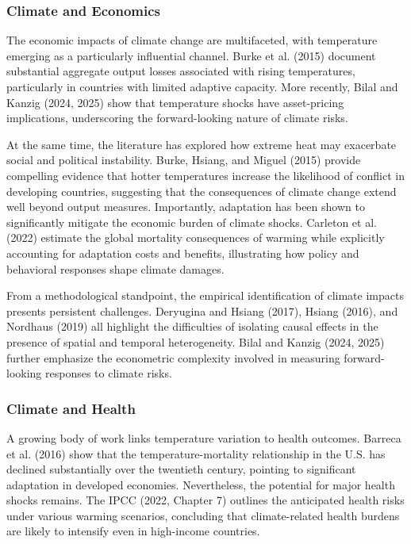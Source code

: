 \documentclass{article}
\begin{document}
\subsubsection{Climate and Economics}

The economic impacts of climate change are multifaceted, with temperature emerging as a particularly influential channel. Burke et al. (2015) document substantial aggregate output losses associated with rising temperatures, particularly in countries with limited adaptive capacity. More recently, Bilal and Kanzig (2024, 2025) show that temperature shocks have asset-pricing implications, underscoring the forward-looking nature of climate risks.

At the same time, the literature has explored how extreme heat may exacerbate social and political instability. Burke, Hsiang, and Miguel (2015) provide compelling evidence that hotter temperatures increase the likelihood of conflict in developing countries, suggesting that the consequences of climate change extend well beyond output measures. Importantly, adaptation has been shown to significantly mitigate the economic burden of climate shocks. Carleton et al. (2022) estimate the global mortality consequences of warming while explicitly accounting for adaptation costs and benefits, illustrating how policy and behavioral responses shape climate damages.

From a methodological standpoint, the empirical identification of climate impacts presents persistent challenges. Deryugina and Hsiang (2017), Hsiang (2016), and Nordhaus (2019) all highlight the difficulties of isolating causal effects in the presence of spatial and temporal heterogeneity. Bilal and Kanzig (2024, 2025) further emphasize the econometric complexity involved in measuring forward-looking responses to climate risks.

\subsubsection{Climate and Health}

A growing body of work links temperature variation to health outcomes. Barreca et al. (2016) show that the temperature-mortality relationship in the U.S. has declined substantially over the twentieth century, pointing to significant adaptation in developed economies. Nevertheless, the potential for major health shocks remains. The IPCC (2022, Chapter 7) outlines the anticipated health risks under various warming scenarios, concluding that climate-related health burdens are likely to intensify even in high-income countries.
\end{document}

